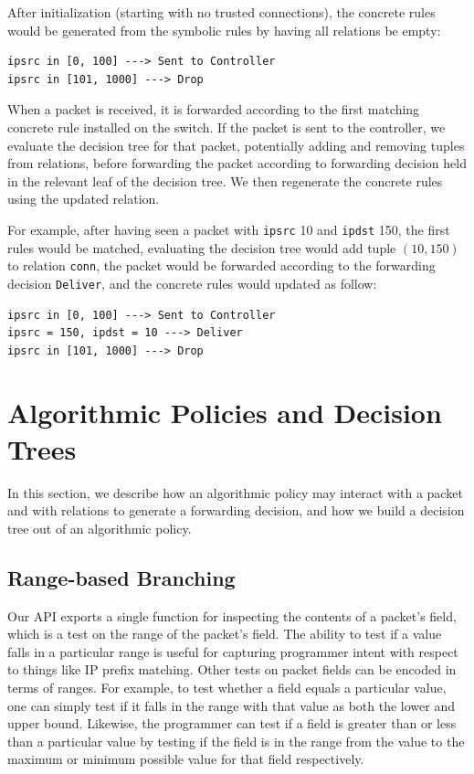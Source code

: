 \documentclass[preprint]{sigplanconf}
\begin{document}
After initialization (starting with no trusted connections), the concrete rules would be generated from the symbolic rules by having all relations be empty:
\begin{lstlisting}
ipsrc in [0, 100] ---> Sent to Controller  
ipsrc in [101, 1000] ---> Drop  
\end{lstlisting}
  

  When a packet is received, it is forwarded according to the first matching concrete rule installed on the switch. If the packet is sent to the controller, we evaluate the decision tree for that packet, potentially adding and removing tuples from relations, before forwarding the packet according to forwarding decision held in the relevant leaf of the decision tree. We then regenerate the concrete rules using the updated relation. 
  
 For example, after having seen a packet with \lstinline|ipsrc| 10 and \lstinline|ipdst| 150, the first rules would be matched, evaluating the decision tree would add tuple $(10,150)$ to relation \lstinline|conn|, the packet would be forwarded according to the forwarding decision \lstinline|Deliver|, and the concrete rules would updated as follow:

\begin{lstlisting}
ipsrc in [0, 100] ---> Sent to Controller  
ipsrc = 150, ipdst = 10 ---> Deliver  
ipsrc in [101, 1000] ---> Drop  
\end{lstlisting}
  
  

\section*{Algorithmic Policies and Decision Trees}
In this section, we describe how an algorithmic policy may interact with a packet and with relations to generate a forwarding decision, and how we build a decision tree out of an algorithmic policy.

   \subsection*{Range-based Branching}
   

   Our API exports a single function for inspecting the contents of a packet's field, which is a test on the range of the packet's field. The ability to test if a value falls in a particular range is useful for capturing programmer intent with respect to things like IP prefix matching. Other tests on packet fields can be encoded in terms of ranges. For example, to test whether a field equals a particular value, one can simply test if it falls in the range with that value as both the lower and upper bound. Likewise, the programmer can test if a field is greater than or less than a particular value by testing if the field is in the range from the value to the maximum or minimum possible value for that field respectively. 
   
\end{document}
